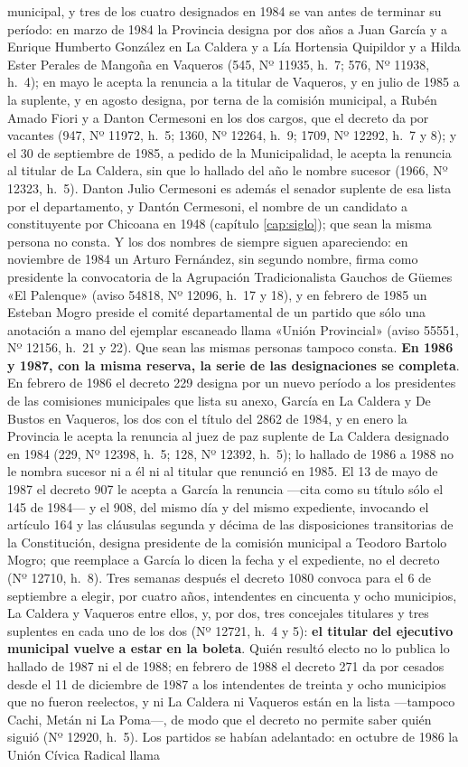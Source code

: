 municipal, y tres de los cuatro designados en 1984 se van antes de terminar su período: en marzo de 1984 la Provincia designa por dos años a Juan García y a Enrique Humberto González en La Caldera y a Lía Hortensia Quipildor y a Hilda Ester Perales de Mangoña en Vaqueros (545, Nº 11935, h.\ 7; 576, Nº 11938, h.\ 4); en mayo le acepta la renuncia a la titular de Vaqueros, y en julio de 1985 a la suplente, y en agosto designa, por terna de la comisión municipal, a Rubén Amado Fiori y a Danton Cermesoni en los dos cargos, que el decreto da por vacantes (947, Nº 11972, h.\ 5; 1360, Nº 12264, h.\ 9; 1709, Nº 12292, h.\ 7 y 8); y el 30 de septiembre de 1985, a pedido de la Municipalidad, le acepta la renuncia al titular de La Caldera, sin que lo hallado del año le nombre sucesor (1966, Nº 12323, h.\ 5). Danton Julio Cermesoni es además el senador suplente de esa lista por el departamento, y Dantón Cermesoni, el nombre de un candidato a constituyente por Chicoana en 1948 (capítulo \ref{cap:siglo}); que sean la misma persona no consta. Y los dos nombres de siempre siguen apareciendo: en noviembre de 1984 un Arturo Fernández, sin segundo nombre, firma como presidente la convocatoria de la Agrupación Tradicionalista Gauchos de Güemes «El Palenque» (aviso 54818, Nº 12096, h.\ 17 y 18), y en febrero de 1985 un Esteban Mogro preside el comité departamental de un partido que sólo una anotación a mano del ejemplar escaneado llama «Unión Provincial» (aviso 55551, Nº 12156, h.\ 21 y 22). Que sean las mismas personas tampoco consta. \textbf{En 1986 y 1987, con la misma reserva, la serie de las designaciones se completa}. En febrero de 1986 el decreto 229 designa por un nuevo período a los presidentes de las comisiones municipales que lista su anexo, García en La Caldera y De Bustos en Vaqueros, los dos con el título del 2862 de 1984, y en enero la Provincia le acepta la renuncia al juez de paz suplente de La Caldera designado en 1984 (229, Nº 12398, h.\ 5; 128, Nº 12392, h.\ 5); lo hallado de 1986 a 1988 no le nombra sucesor ni a él ni al titular que renunció en 1985. El 13 de mayo de 1987 el decreto 907 le acepta a García la renuncia ---cita como su título sólo el 145 de 1984--- y el 908, del mismo día y del mismo expediente, invocando el artículo 164 y las cláusulas segunda y décima de las disposiciones transitorias de la Constitución, designa presidente de la comisión municipal a Teodoro Bartolo Mogro; que reemplace a García lo dicen la fecha y el expediente, no el decreto (Nº 12710, h.\ 8). Tres semanas después el decreto 1080 convoca para el 6 de septiembre a elegir, por cuatro años, intendentes en cincuenta y ocho municipios, La Caldera y Vaqueros entre ellos, y, por dos, tres concejales titulares y tres suplentes en cada uno de los dos (Nº 12721, h.\ 4 y 5): \textbf{el titular del ejecutivo municipal vuelve a estar en la boleta}. Quién resultó electo no lo publica lo hallado de 1987 ni el de 1988; en febrero de 1988 el decreto 271 da por cesados desde el 11 de diciembre de 1987 a los intendentes de treinta y ocho municipios que no fueron reelectos, y ni La Caldera ni Vaqueros están en la lista ---tampoco Cachi, Metán ni La Poma---, de modo que el decreto no permite saber quién siguió (Nº 12920, h.\ 5). Los partidos se habían adelantado: en octubre de 1986 la Unión Cívica Radical llama 